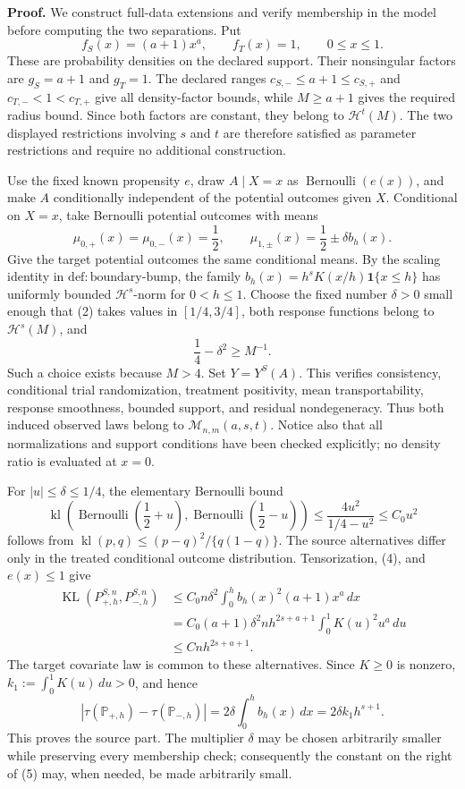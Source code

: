 \textbf{Proof.}
We construct full-data extensions and verify membership in the model before computing the two separations.  Put
\[
f_S(x)=(a+1)x^a,
\qquad
f_T(x)=1,
\qquad 0\le x\le1.
\tag{1}
\]
These are probability densities on the declared support.  Their nonsingular factors are \(g_S=a+1\) and \(g_T=1\).  The declared ranges \(c_{S,-}\le a+1\le c_{S,+}\) and \(c_{T,-}<1<c_{T,+}\) give all density-factor bounds, while \(M\ge a+1\) gives the required radius bound.  Since both factors are constant, they belong to \(\mathcal H^t(M)\).  The two displayed restrictions involving \(s\) and \(t\) are therefore satisfied as parameter restrictions and require no additional construction.

Use the fixed known propensity \(e\), draw \(A\mid X=x\) as \(\operatorname{Bernoulli}(e(x))\), and make \(A\) conditionally independent of the potential outcomes given \(X\).  Conditional on \(X=x\), take Bernoulli potential outcomes with means
\[
\mu_{0,+}(x)=\mu_{0,-}(x)=\frac12,
\qquad
\mu_{1,\pm}(x)=\frac12\pm\delta b_h(x).
\tag{2}
\]
Give the target potential outcomes the same conditional means.  By the scaling identity in \(\mathrm{def:boundary\text{-}bump}\), the family \(b_h(x)=h^sK(x/h)\mathbf 1\{x\le h\}\) has uniformly bounded \(\mathcal H^s\)-norm for \(0<h\le1\).  Choose the fixed number \(\delta>0\) small enough that (2) takes values in \([1/4,3/4]\), both response functions belong to \(\mathcal H^s(M)\), and
\[
\frac14-\delta^2\ge M^{-1}.
\tag{3}
\]
Such a choice exists because \(M>4\).  Set \(Y=Y^S(A)\).  This verifies consistency, conditional trial randomization, treatment positivity, mean transportability, response smoothness, bounded support, and residual nondegeneracy.  Thus both induced observed laws belong to \(\mathcal M_{n,m}(a,s,t)\).  Notice also that all normalizations and support conditions have been checked explicitly; no density ratio is evaluated at \(x=0\).

For \(|u|\le\delta\le1/4\), the elementary Bernoulli bound
\[
\operatorname{kl}\!\left(\operatorname{Bernoulli}\!\left(\frac12+u\right),
\operatorname{Bernoulli}\!\left(\frac12-u\right)\right)
\le \frac{4u^2}{1/4-u^2}
\le C_0u^2
\tag{4}
\]
follows from \(\operatorname{kl}(p,q)\le(p-q)^2/\{q(1-q)\}\).  The source alternatives differ only in the treated conditional outcome distribution.  Tensorization, (4), and \(e(x)\le1\) give
\[
\begin{aligned}
\operatorname{KL}(P_{+,h}^{S,n},P_{-,h}^{S,n})
&\le C_0n\delta^2\int_0^h b_h(x)^2(a+1)x^a\,dx\\
&=C_0(a+1)\delta^2nh^{2s+a+1}
  \int_0^1K(u)^2u^a\,du\\
&\le Cnh^{2s+a+1}.
\end{aligned}
\tag{5}
\]
The target covariate law is common to these alternatives.  Since \(K\ge0\) is nonzero, \(k_1:=\int_0^1K(u)\,du>0\), and hence
\[
\left|\tau(\mathbb P_{+,h})-\tau(\mathbb P_{-,h})\right|
=2\delta\int_0^hb_h(x)\,dx
=2\delta k_1h^{s+1}.
\tag{6}
\]
This proves the source part.  The multiplier \(\delta\) may be chosen arbitrarily smaller while preserving every membership check; consequently the constant on the right of (5) may, when needed, be made arbitrarily small.

